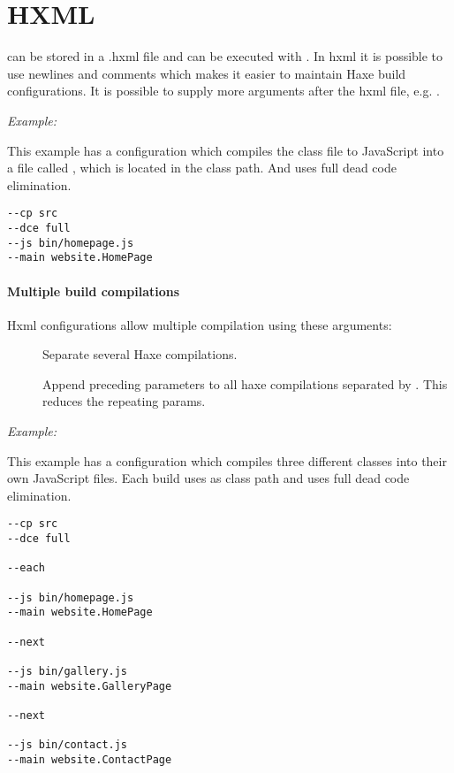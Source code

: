 \section{HXML}
\label{compiler-usage-hxml}

 can be stored in a .hxml file and can be executed with .
In hxml it is possible to use newlines and comments which makes it easier to maintain Haxe build configurations.
It is possible to supply more arguments after the hxml file, e.g. .

\emph{Example:}

This example has a configuration which compiles the class file  to JavaScript into a file called , which is located in the  class path. And uses full dead code elimination.

\begin{lstlisting}
--cp src
--dce full
--js bin/homepage.js
--main website.HomePage
\end{lstlisting}

\paragraph{Multiple build compilations}

Hxml configurations allow multiple compilation using these arguments:

\begin{description}
	\item[] Separate several Haxe compilations.
	\item[] Append preceding parameters to all haxe compilations separated by . This reduces the repeating params.
\end{description}

\emph{Example:}

This example has a configuration which compiles three different classes into their own JavaScript files. Each build uses  as class path and uses full dead code elimination.

\begin{lstlisting}
--cp src
--dce full

--each

--js bin/homepage.js
--main website.HomePage

--next  

--js bin/gallery.js
--main website.GalleryPage

--next  

--js bin/contact.js
--main website.ContactPage
\end{lstlisting}

